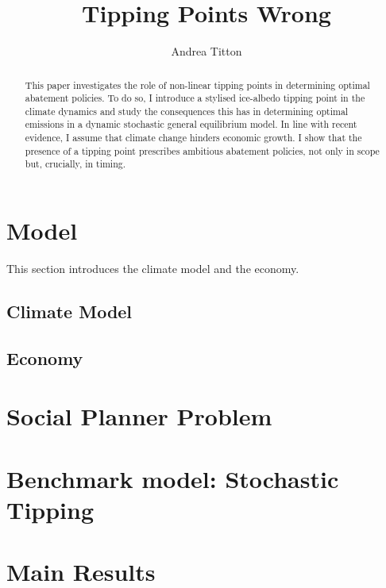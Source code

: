 \documentclass[12pt]{article}
\author{Andrea Titton}
\title{Tipping Points Wrong}
\begin{document}
\maketitle

\begin{abstract}
  This paper investigates the role of non-linear tipping points in determining optimal abatement policies. To do so, I introduce a stylised ice-albedo tipping point in the climate dynamics and study the consequences this has in determining optimal emissions in a dynamic stochastic general equilibrium model. In line with recent evidence, I assume that climate change hinders economic growth. I show that the presence of a tipping point prescribes ambitious abatement policies, not only in scope but, crucially, in timing.
\end{abstract}

\newpage


\section{Model}

This section introduces the climate model and the economy.

\subsection{Climate Model}



\subsection{Economy}




\section{Social Planner Problem}



\section{Benchmark model: Stochastic Tipping}



\section{Main Results}
\end{document}
